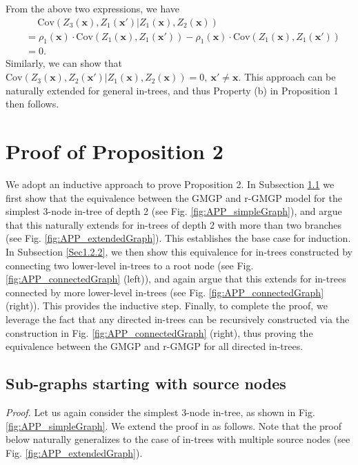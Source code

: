 \documentclass[12pt]{article}
\newcommand{\bs}[1]{\boldsymbol{#1}}
\begin{document}
\noindent From the above two expressions, we have
\begin{align*}
    &\quad \ \text{Cov}(Z_3(\bs{x}),Z_1(\bs{x}')|Z_1(\bs{x}),Z_2(\bs{x}))\\ &= \rho_1(\bs{x})\cdot \text{Cov}(Z_1(\bs{x}),Z_1(\bs{x}')) - \rho_1(\bs{x})\cdot \text{Cov}(Z_1(\bs{x}),Z_1(\bs{x}'))\\
    &= 0.
\end{align*}
\noindent Similarly, we can show that $\text{Cov}(Z_3(\bs{x}),Z_2(\bs{x}')|Z_1(\bs{x}),Z_2(\bs{x}))=0,\ \bs{x}'\neq\bs{x}$. This approach can be naturally extended for general in-trees, and thus Property (b) in Proposition 1 then follows. 

\newpage

\section{Proof of Proposition 2}

We adopt an inductive approach to prove Proposition 2. In Subsection \ref{Sec1.2.1} we first show that the equivalence between the GMGP and r-GMGP model for the simplest 3-node in-tree of depth 2 (see Fig. \ref{fig:APP_simpleGraph}), and argue that this naturally extends for in-trees of depth 2 with more than two branches (see Fig. \ref{fig:APP_extendedGraph}). This establishes the base case for induction. In Subsection \ref{Sec1.2.2}, we then show this equivalence for in-trees constructed by connecting two lower-level in-trees to a root node (see Fig. \ref{fig:APP_connectedGraph} (left)), and again argue that this extends for in-trees connected by more lower-level in-trees (see Fig. \ref{fig:APP_connectedGraph} (right)). This provides the inductive step. Finally, to complete the proof, we leverage the fact that any directed in-trees can be recursively constructed via the construction in Fig. \ref{fig:APP_connectedGraph} (right), thus proving the equivalence between the GMGP and r-GMGP for all directed in-trees. 

\subsection{Sub-graphs starting with source nodes}\label{Sec1.2.1}

\textit{Proof.} Let us again consider the simplest 3-node in-tree, as shown in Fig. \ref{fig:APP_simpleGraph}. We extend the proof in \cite{LeGratiet_2014} as follows. Note that the proof below naturally generalizes to the case of in-trees with multiple source nodes (see Fig. \ref{fig:APP_extendedGraph}).
\end{document}
